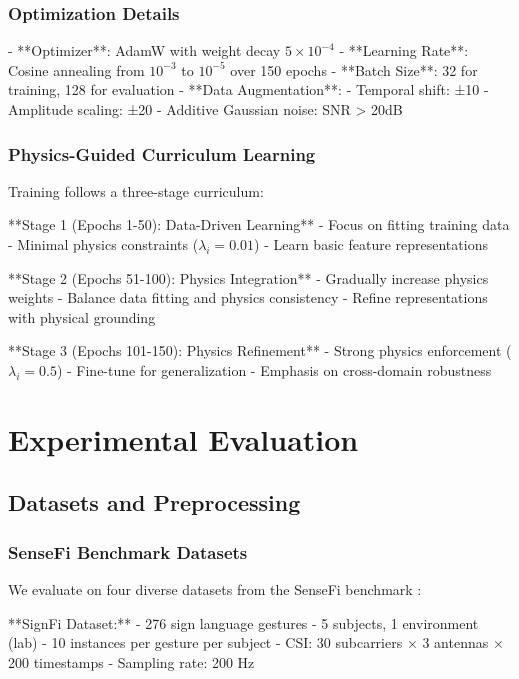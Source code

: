 \documentclass[10pt,journal,compsoc]{IEEEtran}
\begin{document}
\subsubsection{Optimization Details}

- **Optimizer**: AdamW with weight decay $5 \times 10^{-4}$
- **Learning Rate**: Cosine annealing from $10^{-3}$ to $10^{-5}$ over 150 epochs
- **Batch Size**: 32 for training, 128 for evaluation
- **Data Augmentation**: 
  - Temporal shift: ±10%
  - Amplitude scaling: ±20%
  - Additive Gaussian noise: SNR > 20dB

\subsubsection{Physics-Guided Curriculum Learning}

Training follows a three-stage curriculum:

**Stage 1 (Epochs 1-50): Data-Driven Learning**
- Focus on fitting training data
- Minimal physics constraints ($\lambda_i = 0.01$)
- Learn basic feature representations

**Stage 2 (Epochs 51-100): Physics Integration**
- Gradually increase physics weights
- Balance data fitting and physics consistency
- Refine representations with physical grounding

**Stage 3 (Epochs 101-150): Physics Refinement**
- Strong physics enforcement ($\lambda_i = 0.5$)
- Fine-tune for generalization
- Emphasis on cross-domain robustness

\section{Experimental Evaluation}
\label{sec:experiments}

\subsection{Datasets and Preprocessing}

\subsubsection{SenseFi Benchmark Datasets}

We evaluate on four diverse datasets from the SenseFi benchmark \cite{yang2023sensefi}:

**SignFi Dataset:**
- 276 sign language gestures
- 5 subjects, 1 environment (lab)
- 10 instances per gesture per subject
- CSI: 30 subcarriers × 3 antennas × 200 timestamps
- Sampling rate: 200 Hz
\end{document}
